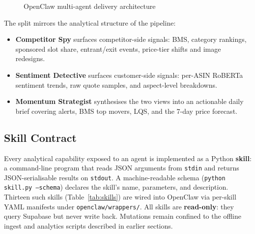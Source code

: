 \begin{figure}[H]
  \centering
  \caption{OpenClaw multi-agent delivery architecture}
  \label{fig:openclaw}
\end{figure}

The split mirrors the analytical structure of the pipeline:

\begin{itemize}
  \item \textbf{Competitor Spy} surfaces competitor-side signals: BMS,
  category rankings, sponsored slot share, entrant/exit events, price-tier
  shifts and image redesigns.
  \item \textbf{Sentiment Detective} surfaces customer-side signals: per-ASIN
  RoBERTa sentiment trends, raw quote samples, and aspect-level breakdowns.
  \item \textbf{Momentum Strategist} synthesises the two views into an
  actionable daily brief covering alerts, BMS top movers, LQS, and the 7-day
  price forecast.
\end{itemize}

\subsection{Skill Contract}

Every analytical capability exposed to an agent is implemented as a Python
\textbf{skill}: a command-line program that reads JSON arguments from
\texttt{stdin} and returns JSON-serialisable results on \texttt{stdout}. A
machine-readable schema (\texttt{python skill.py --schema}) declares the
skill's name, parameters, and description. Thirteen such skills (Table~\ref{tab:skills})
are wired into OpenClaw via per-skill YAML manifests under
\texttt{openclaw/wrappers/}. All skills are \textbf{read-only}: they query
Supabase but never write back. Mutations remain confined to the offline
ingest and analytics scripts described in earlier sections.

